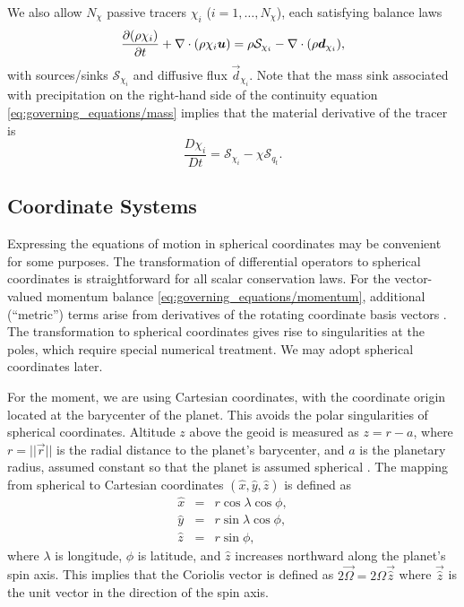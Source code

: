 \documentclass{report}
\begin{document}
We also allow $N_\chi$ passive tracers $\chi_i$ ($i=1, \dots, N_\chi$), each satisfying balance laws
\begin{equation}
\frac{\partial (\rho \chi_i)}{\partial t} + \nabla \cdot \left(\rho \chi_i \boldsymbol{{u}} \right) = \rho \mathcal{S}_{\chi_i} - \nabla \cdot (\rho \boldsymbol{{d}}_{\chi_i}),   
\label{eq:tracers}
\end{equation}
with sources/sinks $\mathcal{S}_{\chi_i}$ and diffusive flux $\vec{d}_{\chi_i}$. Note that the mass sink associated with precipitation on the right-hand side of the continuity equation \eqref{eq:governing_equations/mass} implies that the material derivative of the tracer is 
\[
\frac{D\chi_i}{Dt} = \mathcal{S}_{\chi_i} - \chi \mathcal{S}_{q_t}.
\]
 
\subsection{Coordinate Systems}

Expressing the equations of motion in spherical coordinates may be convenient for some purposes. The transformation of differential operators to spherical coordinates is straightforward for all scalar conservation laws. For the vector-valued momentum balance \eqref{eq:governing_equations/momentum}, additional (``metric'') terms arise from derivatives of the rotating coordinate basis vectors \citep[e.g.,][]{Staniforth03a}. The transformation to spherical coordinates gives rise to singularities at the poles, which require special numerical treatment.  We may adopt spherical coordinates later. 

For the moment, we are using Cartesian coordinates, with the coordinate origin located at the barycenter of the planet. This avoids the polar singularities of spherical coordinates. Altitude $z$ above the geoid is measured as $z=r-a$, where $r=||\vec{r}||$ is the radial distance to the planet's barycenter, and $a$ is the planetary radius, assumed constant so that the planet is assumed spherical \citep[see][]{giraldo:2001,giraldo:2002,giraldo:2013}. The mapping from spherical to Cartesian coordinates $(\hat x, \hat y, \hat z)$ is defined as
\begin{eqnarray*}
\hat x &=& r \cos \lambda \cos \phi,\\
\hat y &=& r \sin \lambda \cos \phi, \\
\hat z &=& r \sin \phi,
\end{eqnarray*}
where $\lambda$ is longitude, $\phi$ is latitude, and $\hat z$ increases northward along the planet's spin axis. This implies that the Coriolis vector is defined as $2 \vec{\Omega} = 2 \Omega \vec{\hat z}$ where $\vec{\hat z}$ is the unit vector in the direction of the spin axis. 
\end{document}
